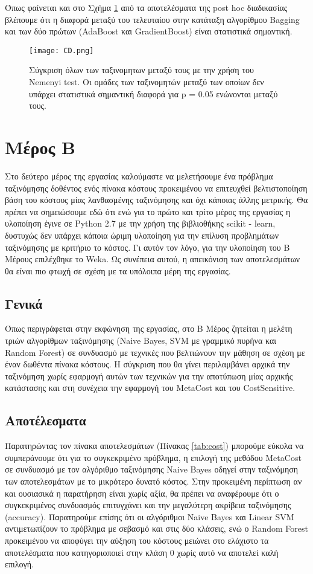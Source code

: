 Όπως φαίνεται και στο Σχήμα \ref{fig:CD} από τα αποτελέσματα της post hoc διαδικασίας βλέπουμε ότι η διαφορά μεταξύ του τελευταίου στην κατάταξη αλγορίθμου Bagging και των δύο πρώτων (AdaBoost και GradientBoost) είναι στατιστικά σημαντική.

\begin{figure}
	\centering
	\texttt{[image: CD.png]} %
	\caption{Σύγκριση όλων των ταξινομητων μεταξύ τους με την χρήση του Nemenyi test. Οι ομάδες των ταξινομητών μεταξύ των οποίων δεν υπάρχει στατιστικά σημαντική διαφορά για p = 0.05 ενώνονται μεταξύ τους.}
	\label{fig:CD}
\end{figure}


\section{Μέρος Β}
Στο δεύτερο μέρος της εργασίας καλούμαστε να μελετήσουμε ένα πρόβλημα ταξινόμησης δοθέντος ενός πίνακα κόστους προκειμένου να επιτευχθεί βελτιστοποίηση βάση του κόστους μίας λανθασμένης ταξινόμησης και όχι κάποιας άλλης μετρικής. Θα πρέπει να σημειώσουμε εδώ ότι ενώ για το πρώτο και τρίτο μέρος της εργασίας η υλοποίηση έγινε σε Python 2.7 με την χρήση της βιβλιοθήκης scikit - learn, δυστυχώς δεν υπάρχει κάποια ώριμη υλοποίηση για την επίλυση προβλημάτων ταξινόμησης με κριτήριο το κόστος. Γι αυτόν τον λόγο, για την υλοποίηση του Β Μέρους επιλέχθηκε το Weka. Ως συνέπεια αυτού, η απεικόνιση των αποτελεσμάτων θα είναι πιο φτωχή σε σχέση με τα υπόλοιπα μέρη της εργασίας.


\subsection{Γενικά}
Όπως περιγράφεται στην εκφώνηση της εργασίας, στο Β Μέρος ζητείται η μελέτη τριών αλγορίθμων ταξινόμησης (Naive Bayes, SVM με γραμμικό πυρήνα και Random Forest) σε συνδυασμό με τεχνικές που βελτιώνουν την μάθηση σε σχέση με έναν δωθέντα πίνακα κόστους. Η σύγκριση που θα γίνει περιλαμβάνει αρχικά την ταξινόμηση χωρίς εφαρμογή αυτών των τεχνικών για την αποτύπωση μίας αρχικής κατάστασης και στη συνέχεια την εφαρμογή του MetaCost και του CostSensitive. 

\subsection{Αποτέλεσματα}
Παρατηρώντας τον πίνακα αποτελεσμάτων (Πίνακας \ref{tab:cost}) μπορούμε εύκολα να συμπεράνουμε ότι για το συγκεκριμένο πρόβλημα, η επιλογή της μεθόδου MetaCost σε συνδυασμό με τον αλγόριθμο ταξινόμησης Naive Bayes οδηγεί στην ταξινόμηση των αποτελεσμάτων με το μικρότερο δυνατό κόστος. Στην προκειμένη περίπτωση αν και ουσιασικά η παρατήρηση είναι χωρίς αξία, θα πρέπει να αναφέρουμε ότι ο συγκεκριμένος συνδυασμός επιτυγχάνει και την μεγαλύτερη ακρίβεια ταξινόμησης (accuracy). Παρατηρούμε επίσης ότι οι αλγόριθμοι Naive Bayes και Linear SVM αντιμετωπίζουν το πρόβλημα με σεβασμό και στις δύο κλάσεις, ενώ ο Random Forest προκειμένου να αποφύγει την αύξηση του κόστους μειώνει στο ελάχιστο τα αποτελέσματα που κατηγοριοποιεί στην κλάση 0 χωρίς αυτό να αποτελεί καλή επιλογή. 



